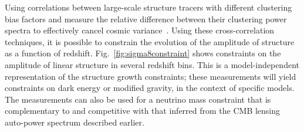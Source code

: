 \documentclass[PICOReport.tex]{subfiles}
\begin{document}


Using correlations between large-scale structure tracers with different clustering bias factors and measure the relative difference between their clustering power spectra to effectively cancel cosmic variance~\citep{2009PhRvL.102b1302S,2018PhRvD..97l3540S}. Using these cross-correlation techniques, it is possible to constrain the evolution of the amplitude of structure as a function of redshift.  Fig.~\ref{fig:sigma8constraint} shows constraints on the amplitude of linear structure in several redshift bins.  This is a model-independent representation of the structure growth constraints; these measurements will yield constraints on dark energy or modified gravity, in the context of specific models.  The measurements can also be used for a neutrino mass constraint that is complementary to and competitive with that inferred from the CMB lensing auto-power spectrum described earlier.  


\end{document}
